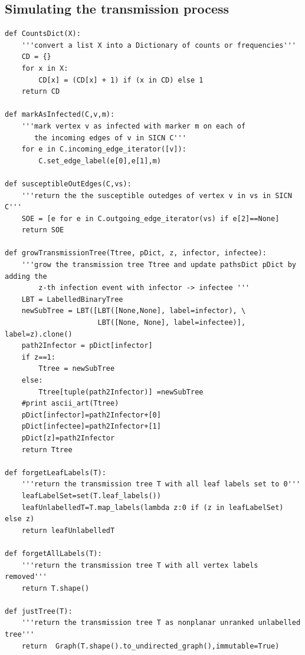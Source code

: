 \documentclass[review]{elsarticle}
\numberwithin{equation}{section}
\begin{document}
\subsection{Simulating the transmission process}\label{Sec:codeA}
{\scriptsize
\begin{verbatim}
def CountsDict(X):
    '''convert a list X into a Dictionary of counts or frequencies'''
    CD = {}
    for x in X:
        CD[x] = (CD[x] + 1) if (x in CD) else 1
    return CD

def markAsInfected(C,v,m):
    '''mark vertex v as infected with marker m on each of 
       the incoming edges of v in SICN C'''
    for e in C.incoming_edge_iterator([v]):
        C.set_edge_label(e[0],e[1],m)

def susceptibleOutEdges(C,vs):
    '''return the the susceptible outedges of vertex v in vs in SICN C'''
    SOE = [e for e in C.outgoing_edge_iterator(vs) if e[2]==None]
    return SOE

def growTransmissionTree(Ttree, pDict, z, infector, infectee):
    '''grow the transmission tree Ttree and update pathsDict pDict by adding the
        z-th infection event with infector -> infectee '''
    LBT = LabelledBinaryTree
    newSubTree = LBT([LBT([None,None], label=infector), \
                      LBT([None, None], label=infectee)], label=z).clone()
    path2Infector = pDict[infector]
    if z==1:
        Ttree = newSubTree
    else:
        Ttree[tuple(path2Infector)] =newSubTree
    #print ascii_art(Ttree)
    pDict[infector]=path2Infector+[0]
    pDict[infectee]=path2Infector+[1]
    pDict[z]=path2Infector
    return Ttree

def forgetLeafLabels(T):
    '''return the transmission tree T with all leaf labels set to 0'''
    leafLabelSet=set(T.leaf_labels())
    leafUnlabelledT=T.map_labels(lambda z:0 if (z in leafLabelSet) else z)
    return leafUnlabelledT

def forgetAllLabels(T):
    '''return the transmission tree T with all vertex labels removed'''
    return T.shape()

def justTree(T):
    '''return the transmission tree T as nonplanar unranked unlabelled tree'''
    return  Graph(T.shape().to_undirected_graph(),immutable=True)


\end{verbatim}}
\end{document}
